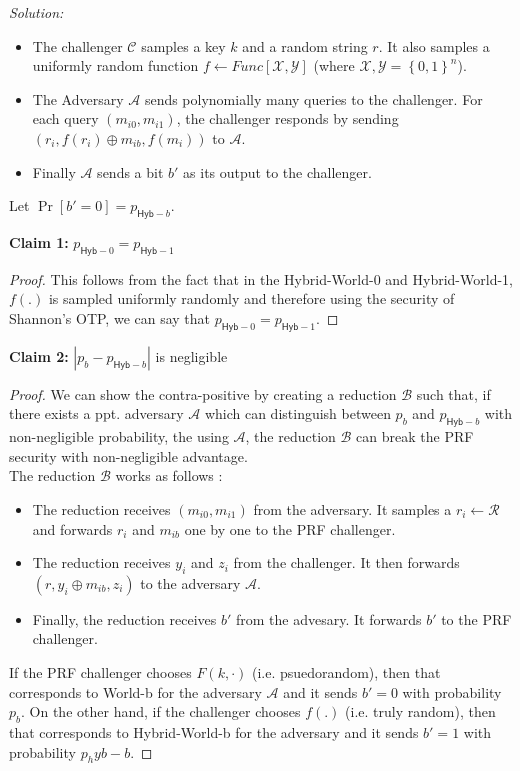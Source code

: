 \documentclass[a4paper, 11pt]{article}
\newenvironment{solution}
    {\textit{Solution:}}
    {\clearpage}
\newcommand{\bit}{\left\{0, 1\right\}}
\newcommand{\hyb}{\mathsf{Hyb}}
\newcommand{\calA}{\mathcal{A}}
\newcommand{\calB}{\mathcal{B}}
\newcommand{\calC}{\mathcal{C}}
\newcommand{\calX}{\mathcal{X}}
\newcommand{\calY}{\mathcal{Y}}
\newcommand{\calR}{\mathcal{R}}
\begin{document}
\begin{solution}
    \begin{world}
        \begin{itemize}
            \item The challenger $\calC$ samples a key $k$ and a random string $r$. It also samples a uniformly random function $f \leftarrow Func[\calX, \calY]$ (where $\calX, \calY = \bit^n$).
            \item The Adversary $\calA$ sends polynomially many queries to the challenger. For each query $(m_{i0}, m_{i1})$, the challenger responds by sending $(r_i, f(r_i) \oplus m_{ib}, f(m_i))$ to $\calA$.
            \item Finally $\calA$ sends a bit $b'$ as its output to the challenger.
        \end{itemize}
        Let $\Pr[b' = 0] = p_{\hyb-b}$.
    \end{world}
    \textbf{Claim 1:} $p_{\hyb-0} = p_{\hyb-1}$ \\
    \begin{proof} This follows from the fact that in the Hybrid-World-0 and Hybrid-World-1, $f(.)$ is sampled uniformly randomly and therefore using the security of Shannon's OTP, we can say that $p_{\hyb-0} = p_{\hyb-1}$.
    \end{proof}
    \textbf{Claim 2:} $| p_{b} - p_{\hyb-b} |$ is negligible \\
    \begin{proof} We can show the contra-positive by creating a reduction $\calB$ such that, if there exists a ppt. adversary $\calA$ which can distinguish between $p_{b}$ and $p_{\hyb-b}$ with non-negligible probability, the using $\calA$, the reduction $\calB$ can break the PRF security with non-negligible advantage.\\
        The reduction $\calB$ works as follows :
        \begin{itemize}
            \item The reduction receives $(m_{i0}, m_{i1})$ from the adversary. It samples a $r_i \leftarrow \calR$ and forwards $r_i$ and $m_{ib}$ one by one to the PRF challenger.
            \item The reduction receives $y_i$ and $z_i$ from the challenger. It then forwards $(r, y_i \oplus m_{ib}, z_i)$ to the adversary $\calA$.
            \item Finally, the reduction receives $b'$ from the advesary. It forwards $b'$ to the PRF challenger.
        \end{itemize}
        If the PRF challenger chooses $F(k, \cdot)$ (i.e. psuedorandom), then that corresponds to World-b for the adversary $\calA$ and it sends $b' = 0$ with probability $p_b$. On the other hand, if the challenger chooses $f(.)$ (i.e. truly random), then that corresponds to Hybrid-World-b for the adversary and it sends $b' = 1$ with probability $p_hyb-b$.

\end{proof}
\end{solution}
\end{document}
